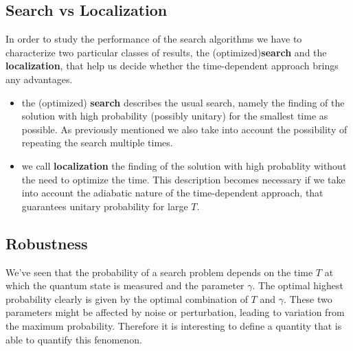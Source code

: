     \subsection{Search vs Localization}
      In order to study the performance of the search algorithms we have to characterize two particular classes of results, the (optimized)\textbf{search} and the \textbf{localization}, that help us decide whether the time-dependent approach brings any advantages.
      \begin{itemize}
          \item the (optimized) \textbf{search} describes the usual search, namely the finding of the solution with high probability (possibly unitary) for the smallest time as possible. As previously mentioned we also take into account the possibility of repeating the search multiple times.
          \item we call \textbf{localization} the finding of the solution with high probablity without the need to optimize the time. This description becomes necessary if we take into account the adiabatic nature of the time-dependent approach, that guarantees unitary probability for large $T$.
      \end{itemize}

    \subsection{Robustness}
        We've seen that the probability of a search problem depends on the time $T$ at which the quantum state is measured and the parameter $\gamma$. The optimal highest probability clearly is given by the optimal combination of $T$ and $\gamma$. These two parameters might be affected by noise or perturbation, leading to variation from the maximum probability. Therefore it is interesting to define a quantity that is able to quantify this fenomenon.

